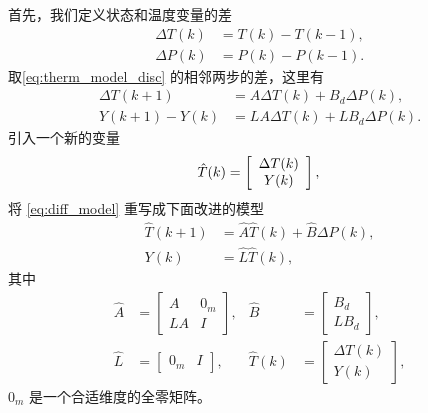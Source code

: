 首先，我们定义状态和温度变量的差
\begin{equation}
\begin{split}
\Delta T(k) &= T(k) - T(k-1), \\
\Delta P(k) &= P(k) - P(k-1).
\end{split}
\end{equation}
取\eqref{eq:therm_model_disc} 的相邻两步的差，这里有
\begin{equation}\label{eq:diff_model}
\begin{split}
\Delta T(k+1) &= A \Delta T(k) + B_d \Delta P(k),\\
Y(k+1)-Y(k) &= L A \Delta T(k) + L B_d \Delta P(k).
\end{split}
\end{equation}
引入一个新的变量
\begin{equation*}
\hat{T}(k) =
\left[
\begin{array}{c}
\Delta T(k)\\
Y(k)
\end{array}
\right],\\
\end{equation*}
将 \eqref{eq:diff_model} 重写成下面改进的模型
\begin{equation}\label{eq:aug_model}
\begin{split}
\hat{T}(k+1) &= \hat{A}\hat{T}(k) + \hat{B}\Delta P(k),\\
Y(k) &= \hat{L}\hat{T}(k),
\end{split}
\end{equation}
其中
\begin{align*}
\hat{A} &= 
\left[
\begin{array}{cc}
A & 0_m\\
L A & I
\end{array}
\right], &
\hat{B} &= 
\left[
\begin{array}{c}
B_d\\
L B_d
\end{array}
\right],\\
\hat{L} &= 
\left[
\begin{array}{cc}
0_m & I
\end{array}
\right], &
\hat{T}(k) &= 
\left[
\begin{array}{c}
\Delta T(k)\\
Y(k)
\end{array}
\right],
\end{align*}
$0_m$ 是一个合适维度的全零矩阵。



